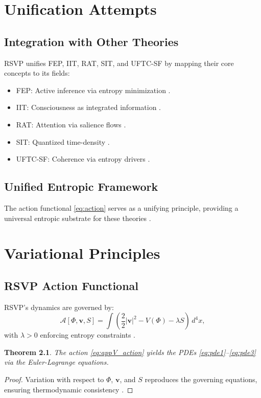 \documentclass[12pt]{report}
\newtheorem{theorem}{Theorem}[chapter]
\newcommand{\PhiRSVP}{\Phi}
\newcommand{\vRSVP}{\mathbf{v}}
\newcommand{\SRSVP}{S}
\begin{document}
\chapter{Unification Attempts}
\label{app:U}
\section{Integration with Other Theories}
RSVP unifies FEP, IIT, RAT, SIT, and UFTC-SF by mapping their core concepts to its fields:
\begin{itemize}
    \item FEP: Active inference via entropy minimization \citep{Friston2010}.
    \item IIT: Consciousness as integrated information \citep{Tononi2016}.
    \item RAT: Attention via salience flows \citep{RAT2025}.
    \item SIT: Quantized time-density \citep{Blumberg2022}.
    \item UFTC-SF: Coherence via entropy drivers \citep{Logan2025}.
\end{itemize}

\section{Unified Entropic Framework}
The action functional \eqref{eq:action} serves as a unifying principle, providing a universal entropic substrate for these theories \citep{RSVPMeta2025}.

\chapter{Variational Principles}
\label{app:V}
\section{RSVP Action Functional}
RSVP’s dynamics are governed by:
\begin{equation}
\mathcal{A}[\PhiRSVP, \vRSVP, \SRSVP] = \int \left( \frac{2}{2} |\vRSVP|^2 - V(\PhiRSVP) - \lambda \SRSVP \right) \, d^4x, \label{eq:appV_action}
\end{equation}
with \(\lambda > 0\) enforcing entropy constraints \citep{RSVPMeta2025}.

\begin{theorem}
The action \eqref{eq:appV_action} yields the PDEs \eqref{eq:pde1}--\eqref{eq:pde3} via the Euler-Lagrange equations.
\end{theorem}
\begin{proof}
Variation with respect to \(\PhiRSVP\), \(\vRSVP\), and \(\SRSVP\) reproduces the governing equations, ensuring thermodynamic consistency \citep{Goldstein2002}.
\end{proof}
\end{document}

